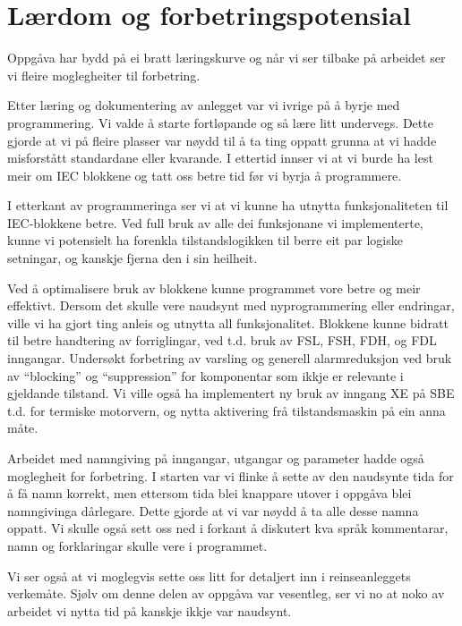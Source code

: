 \section{Lærdom og forbetringspotensial}
\thispagestyle{fancy}

Oppgåva har bydd på ei bratt læringskurve og når vi ser tilbake på arbeidet ser vi fleire moglegheiter til forbetring.

Etter læring og dokumentering av anlegget var vi ivrige på å byrje med programmering.
Vi valde å starte fortløpande og så lære litt undervegs.
Dette gjorde at vi på fleire plasser var nøydd til å ta ting oppatt grunna at vi hadde misforstått standardane eller kvarande.
I ettertid innser vi at vi burde ha lest meir om \gls{IEC} blokkene og tatt oss betre tid før vi byrja å programmere.

I etterkant av programmeringa ser vi at vi kunne ha utnytta funksjonaliteten til IEC-blokkene betre. 
Ved full bruk av alle dei funksjonane vi implementerte, kunne vi potensielt ha forenkla tilstandslogikken til berre eit par logiske setningar, 
og kanskje fjerna den i sin heilheit.

Ved å optimalisere bruk av blokkene kunne programmet vore betre og meir effektivt. 
Dersom det skulle vere naudsynt med nyprogrammering eller endringar, ville vi ha gjort ting anleis og utnytta all funksjonalitet.
Blokkene kunne bidratt til betre handtering av forriglingar, ved t.d. bruk av FSL, FSH, FDH, og FDL inngangar. \newline
Undersøkt forbetring av varsling og generell alarmreduksjon ved bruk av ``blocking'' og ``suppression'' for komponentar som ikkje er relevante i gjeldande tilstand.
Vi ville også ha implementert ny bruk av inngang XE på \gls{SBE} t.d. for termiske motorvern, og nytta aktivering frå tilstandsmaskin på ein anna måte.

Arbeidet med namngiving på inngangar, utgangar og parameter hadde også moglegheit for forbetring.
I starten var vi flinke å sette av den naudsynte tida for å få namn korrekt, men ettersom tida blei knappare utover i oppgåva
blei namngivinga dårlegare. Dette gjorde at vi var nøydd å ta alle desse namna oppatt. \newline
Vi skulle også sett oss ned i forkant å diskutert kva språk kommentarar, namn og forklaringar skulle vere i programmet.

Vi ser også at vi moglegvis sette oss litt for detaljert inn i reinseanleggets verkemåte.
Sjølv om denne delen av oppgåva var vesentleg, ser vi no at noko av arbeidet vi nytta tid på kanskje ikkje var naudsynt.

